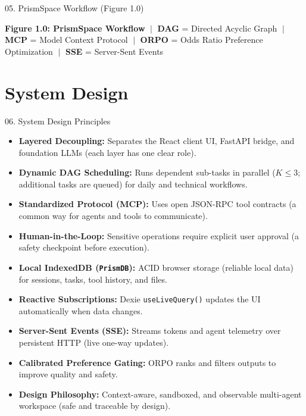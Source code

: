 \documentclass[aspectratio=169,10pt]{beamer}
\begin{document}
\begin{frame}[t]{05. PrismSpace Workflow (Figure 1.0)}
{\begin{tikzpicture}
\end{tikzpicture}%
}
\vspace{0.2em}
\begin{tcolorbox}[
  enhanced, arc=3pt, colframe=lavenderDark!65, colback=lavenderLight!35,
  boxrule=0.6pt, left=4pt, right=4pt, top=1.5pt, bottom=1.5pt
]
\centering\fontsize{4.8}{5.8}\selectfont\color{lavenderDark}
\textbf{Figure 1.0: PrismSpace Workflow} $\;\vert\;$ 
\textbf{DAG} = Directed Acyclic Graph $\;\vert\;$ 
\textbf{MCP} = Model Context Protocol $\;\vert\;$ 
\textbf{ORPO} = Odds Ratio Preference Optimization $\;\vert\;$ 
\textbf{SSE} = Server-Sent Events
\end{tcolorbox}
\end{frame}

\section{System Design}

\begin{frame}[t]{06. System Design Principles}
\vspace{-0.15em}
\begin{itemize}\footnotesize\setlength{\itemsep}{4pt}
  \item \textbf{Layered Decoupling:} Separates the React client UI, FastAPI bridge, and foundation LLMs (each layer has one clear role).
  \item \textbf{Dynamic DAG Scheduling:} Runs dependent sub-tasks in parallel ($K \le 3$; additional tasks are queued) for daily and technical workflows.
  \item \textbf{Standardized Protocol (MCP):} Uses open JSON-RPC tool contracts (a common way for agents and tools to communicate).
  \item \textbf{Human-in-the-Loop:} Sensitive operations require explicit user approval (a safety checkpoint before execution).
  \item \textbf{Local IndexedDB (\texttt{PrismDB}):} ACID browser storage (reliable local data) for sessions, tasks, tool history, and files.
  \item \textbf{Reactive Subscriptions:} Dexie \texttt{useLiveQuery()} updates the UI automatically when data changes.
  \item \textbf{Server-Sent Events (SSE):} Streams tokens and agent telemetry over persistent HTTP (live one-way updates).
  \item \textbf{Calibrated Preference Gating:} ORPO ranks and filters outputs to improve quality and safety.
  \item \textbf{Design Philosophy:} Context-aware, sandboxed, and observable multi-agent workspace (safe and traceable by design).
\end{itemize}
\end{frame}
\end{document}
